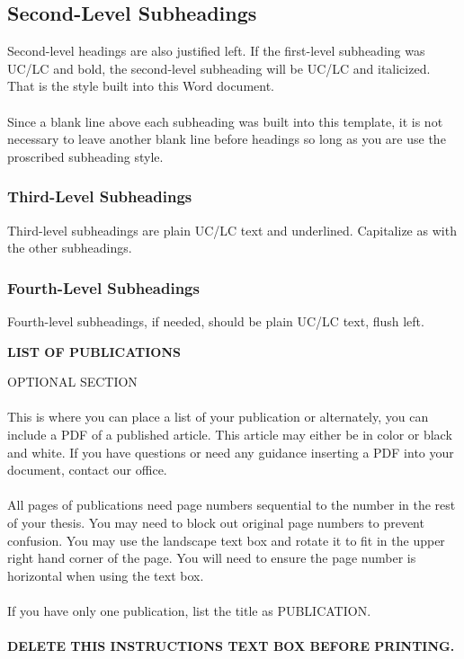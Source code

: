 \documentclass[a4paper,12pt,one side]{report}
\theoremstyle{definition}
\begin{document}
\begin{justify}
\begin{appendix}
 \subsection{Second-Level Subheadings}
 Second-level headings are also justified left. If the first-level subheading was UC/LC and bold, the second-level subheading will be UC/LC and italicized. That is the style built into this Word document.\\~\\
	Since a blank line above each subheading was built into this template, it is not necessary to leave another blank line before headings so long as you are use the proscribed subheading style.
\subsubsection{Third-Level Subheadings}
Third-level subheadings are plain UC/LC text and underlined. Capitalize as with the other subheadings. 
\subsubsection{Fourth-Level Subheadings}

Fourth-level subheadings, if needed, should be plain UC/LC text, flush left. 
\end{appendix} 
\newpage
{}
\begin{center}
\textbf {LIST OF PUBLICATIONS}
\end{center}
 \begin{tcolorbox}[enhanced jigsaw,
    sharp corners,
    boxrule=0.5pt, 
    colback=blue!30!white,   
    borderline={0.5pt}{-2pt}{black,solid} %
 ]
 \begin{justify}
OPTIONAL SECTION\\~\\
This is where you can place a list of your publication or alternately, you can include a PDF of a published article. This article may either be in color or black and white. If you have questions or need any guidance inserting a PDF into your document, contact our office.\\~\\
All pages of publications need page numbers sequential to the number in the rest of your thesis. You may need to block out original page numbers to prevent confusion. You may use the landscape text box and rotate it to fit in the upper right hand corner of the page. You will need to ensure the page number is horizontal when using the text box.\\~\\
If you have only one publication, list the title as PUBLICATION.\\~\\
\bf{DELETE THIS INSTRUCTIONS TEXT BOX BEFORE PRINTING.}
\end{justify}
\end{tcolorbox}
\end{justify}
\end{document}
